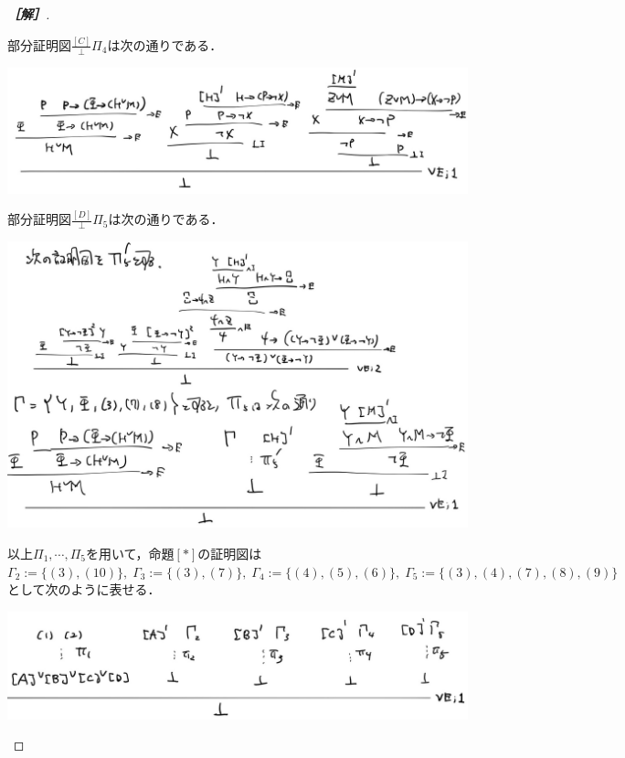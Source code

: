 \documentclass[uplatex,dvipdfmx]{jsarticle}
\begin{document}
\begin{proof}[\bf{［解］}]
\begin{center}
    \end{center}
    部分証明図$\frac{[C]}{\bot}\Pi_4$は次の通りである．
    \begin{center}
        \includegraphics[width=15cm]{figure10.jpg}
    \end{center}
    部分証明図$\frac{[D]}{\bot}\Pi_5$は次の通りである．
    \begin{center}
        \includegraphics[width=15cm]{figure11.jpg}
    \end{center}
    以上$\Pi_1,\cdots,\Pi_5$を用いて，命題$[*]$の証明図は$\Gamma_2:=\{(3),(10)\},\;\Gamma_3:=\{(3),(7)\},\;
    \Gamma_4:=\{(4),(5),(6)\},\;\Gamma_5:=\{(3),(4),(7),(8),(9)\}$として次のように表せる．
    \begin{center}
        \includegraphics[width=15cm]{figure12.jpg}
    \end{center}
\end{proof}

\section{}
\end{document}
